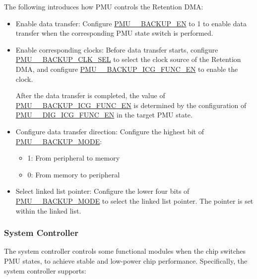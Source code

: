 \documentclass[main\_\_EN.tex]{subfiles}
\begin{document}
The following introduces how PMU controls the Retention DMA:

\begin{itemize}
    \item Enable data transfer: Configure \hyperref[fielddesc:PMUHPSLEEP2ACTIVEBACKUPEN]{PMU\_\_BACKUP\_EN} to 1 to enable data transfer when the corresponding PMU state switch is performed.
    \item Enable corresponding clocks: Before data transfer starts, configure \hyperref[fielddesc:PMUHPMODEM2SLEEPBACKUPCLKSEL]{PMU\_\_BACKUP\_CLK\_SEL} to select the clock source of the Retention DMA, and configure \hyperref[fielddesc:PMUHPACTIVEBACKUPICGFUNCEN]{PMU\_\_BACKUP\_ICG\_FUNC\_EN} to enable the clock.

    After the data transfer is completed, the value of \hyperref[fielddesc:PMUHPACTIVEBACKUPICGFUNCEN]{PMU\_\_BACKUP\_ICG\_FUNC\_EN} is determined by the configuration of \hyperref[fielddesc:PMUHPACTIVEDIGICGFUNCEN]{PMU\_\_DIG\_ICG\_FUNC\_EN} in the target PMU state.

    \item Configure data transfer direction: Configure the highest bit of \hyperref[fielddesc:PMUHPMODEM2SLEEPBACKUPMODE]{PMU\_\_BACKUP\_MODE}:
    \begin{itemize}
        \item 1: From peripheral to memory
        \item 0: From memory to peripheral
    \end{itemize}
    \item Select linked list pointer: Configure the lower four bits of \hyperref[fielddesc:PMUHPMODEM2SLEEPBACKUPMODE]{PMU\_\_BACKUP\_MODE} to select the linked list pointer. The pointer is set within the linked list.\\
\end{itemize}

\subsubsection{System Controller}

The system controller controls some functional modules when the chip switches PMU states, to achieve stable and low-power chip performance. Specifically, the system controller supports:
\end{document}
